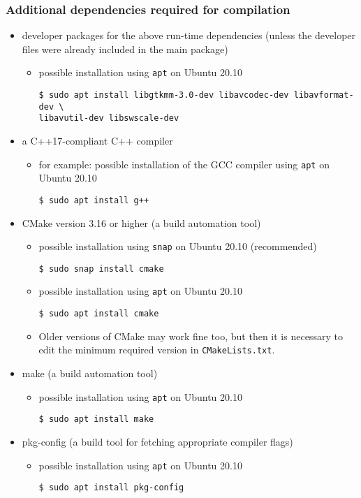 \documentclass{article}
\newcommand{\icd}[1]{\texttt{#1}}
\newcommand{\ccd}[1]{\colorbox{gray!15!white}{\texttt{#1}}}
\newcommand{\scd}[1]{
	\vspace*{5pt}

	\ccd{#1}
	\vspace*{5pt}
}
\newcommand{\sscd}[1]{\scd{\$ sudo #1}}
\newcommand{\aptinstall}[1]{\sscd{apt install #1}}
\newcommand{\snapinstall}[1]{\sscd{snap install #1}}
\newcommand{\defos}{Ubuntu 20.10}
\newcommand{\psubinst}{possible installation using \icd{snap} on \defos}
\newcommand{\pubinst}{possible installation using \icd{apt} on \defos}
\begin{document}
\subsubsection{Additional dependencies required for compilation}\label{sec:compiledeps}
\begin{itemize}
	\item developer packages for the above run-time dependencies (unless the developer files were already included in the main package)
		\begin{itemize}
			\item \pubinst
				\vspace*{5pt}

				\ccd{\$ sudo apt install libgtkmm-3.0-dev libavcodec-dev libavformat-dev \textbackslash}\\
				\ccd{libavutil-dev libswscale-dev}
				\vspace*{5pt}
		\end{itemize}
	\item a C++17-compliant C++ compiler
		\begin{itemize}
			\item for example: possible installation of the GCC compiler using \icd{apt} on \defos
				\aptinstall{g++}
		\end{itemize}
	\item CMake version 3.16 or higher (a build automation tool)
		\begin{itemize}
			\item \psubinst{} (recommended)
				\snapinstall{cmake}
			\item \pubinst
				\aptinstall{cmake}
			\item Older versions of CMake may work fine too, but then it is necessary to edit the minimum required version in \icd{CMakeLists.txt}.
		\end{itemize}
	\item make (a build automation tool)
		\begin{itemize}
			\item \pubinst
				\aptinstall{make}
		\end{itemize}
	\item pkg-config (a build tool for fetching appropriate compiler flags)
		\begin{itemize}
			\item \pubinst
				\aptinstall{pkg-config}
		\end{itemize}
\end{itemize}
\end{document}

